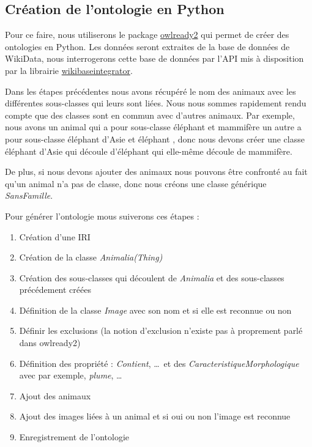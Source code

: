 

\subsection{Création de l'ontologie en Python}

Pour ce faire, nous utiliserons le package \href{https://linuxfr.org/news/owlready-un-module-python-pour-manipuler-les-ontologies-owl}{owlready2} qui permet de créer des ontologies en Python.
Les données seront extraites de la base de données de WikiData, nous interrogerons cette base de données par l'API mis à disposition par la librairie \href{https://github.com/LeMyst/WikibaseIntegrator#execute-sparql-queries}{wikibaseintegrator}.

Dans les étapes précédentes nous avons récupéré le nom des animaux avec les différentes sous-classes qui leurs sont liées.
Nous nous sommes rapidement rendu compte que des classes sont en commun avec d'autres animaux.
Par exemple, nous avons un animal qui a pour sous-classe \og éléphant \fg{} et \og mammifère \fg{} un autre a pour sous-classe \og éléphant d'Asie \fg{} et \og éléphant \fg{}, donc nous devons créer une classe éléphant d'Asie qui découle d'éléphant qui elle-même découle de mammifère.


De plus, si nous devons ajouter des animaux nous pouvons être confronté au fait qu'un animal n'a pas de classe, donc nous créons une classe générique \textit{SansFamille}.

Pour générer l'ontologie mous suiverons ces étapes : 
\begin{enumerate}
    \item Création d'une IRI
    \item Création de la classe \textit{Animalia(Thing)}
    \item Création des sous-classes qui découlent de \textit{Animalia} et des sous-classes précédement créées
    \item Définition de la classe \textit{Image} avec son nom et si elle est reconnue ou non
    \item Définir les exclusions (la notion d'exclusion n'existe pas à proprement parlé dans owlready2)
    \item Définition des propriété : \textit{Contient}, \ldots\ et des \textit{CaracteristiqueMorphologique} avec par exemple, \textit{plume}, \ldots\
    \item Ajout des animaux
    \item Ajout des images liées à un animal et si oui ou non l'image est reconnue 
    \item Enregistrement de l'ontologie
\end{enumerate}


